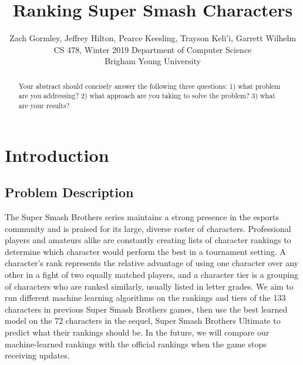 \documentclass{article}
\title{Ranking Super Smash Characters}
\author{Zach Gormley, Jeffrey Hilton, Pearce Keesling, Trayson Keli'i, Garrett Wilhelm\\
CS 478, Winter 2019
Department of Computer Science\\
Brigham Young University}
\begin{document}
\maketitle

\begin{abstract}
  Your abstract should concisely answer the following three questions: 1) what problem are you addressing? 2) what approach are you taking to solve the problem? 3) what are your results?
\end{abstract}

\section{Introduction}
\subsection{Problem Description}
The Super Smash Brothers series maintains a strong presence in the esports community and is praised for its large, diverse roster of characters. Professional players and amateurs alike are constantly creating lists of character rankings to determine which character would perform the best in a tournament setting. A character’s rank represents the relative advantage of using one character over any other in a fight of two equally matched players, and a character tier is a grouping of characters who are ranked similarly, usually listed in letter grades. We aim to run different machine learning algorithms on the rankings and tiers of the 133 characters in previous Super Smash Brothers games, then use the best learned model on the 72 characters in the sequel, Super Smash Brothers Ultimate to predict what their rankings should be. In the future, we will compare our machine-learned rankings with the official rankings when the game stops receiving updates.
\end{document}
